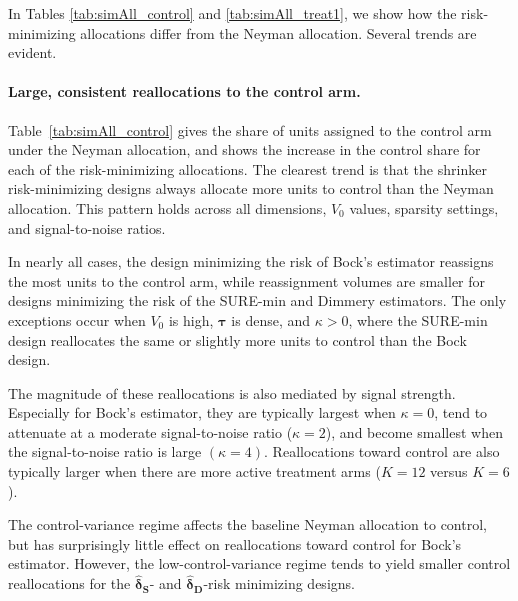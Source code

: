 \documentclass{article}
\newcommand{\bstau}{\boldsymbol \tau}
\newcommand{\bsdeltad}{\boldsymbol{\hat \delta_{\textbf{D}}}}
\newcommand{\bsdelts}{\boldsymbol {\hat \delta_S}}
\begin{document}
In Tables \ref{tab:simAll_control} and \ref{tab:simAll_treat1}, we show how the risk-minimizing allocations differ from the Neyman allocation. Several trends are evident. 


\paragraph{Large, consistent reallocations to the control arm.}
Table~\ref{tab:simAll_control} gives the share of units assigned to the control arm under the Neyman allocation, and shows the increase in the control share for each of the risk-minimizing allocations. The clearest trend is that the shrinker risk-minimizing designs always allocate more units to control than the Neyman allocation. This pattern holds across all dimensions, $V_0$ values, sparsity settings, and signal-to-noise ratios. 

In nearly all cases, the design minimizing the risk of Bock's estimator reassigns the most units to the control arm, while reassignment volumes are smaller for designs minimizing the risk of the SURE-min and Dimmery estimators. The only exceptions occur when $V_0$ is high, $\bstau$ is dense, and $\kappa>0$, where the SURE-min design reallocates the same or slightly more units to control than the Bock design.

The magnitude of these reallocations is also mediated by signal strength. Especially for Bock's estimator, they are typically largest when $\kappa=0$, tend to attenuate at a moderate signal-to-noise ratio ($\kappa = 2$), and become smallest when the signal-to-noise ratio is large $(\kappa = 4)$. Reallocations toward control are also typically larger when there are more active treatment arms ($K = 12$ versus $K = 6$).

The control-variance regime affects the baseline Neyman allocation to control, but has surprisingly little effect on reallocations toward control for Bock's estimator. However, the low-control-variance regime tends to yield smaller control reallocations for the $\bsdelts$- and $\bsdeltad$-risk minimizing designs. 
\end{document}
